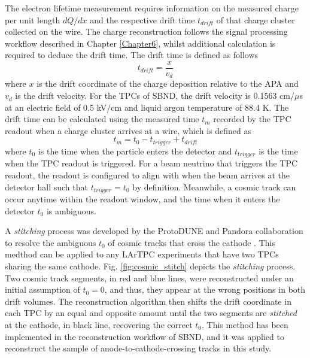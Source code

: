 The electron lifetime measurement requires information on the measured charge per unit length $dQ/dx$ and the respective drift time $t_{drift}$ of that charge cluster collected on the wire.
The charge reconstruction follows the signal processing workflow described in Chapter \ref{Chapter6}, whilst additional calculation is required to deduce the drift time.     
The drift time is defined as follows                                                                                          
\begin{equation}
        t_{drift} = \frac{x}{v_{d}}
\end{equation}
where $x$ is the drift coordinate of the charge deposition relative to the APA and $v_{d}$ is the drift velocity.
For the TPCs of SBND, the drift velocity is 0.1563 cm/$\mu$s at an electric field of 0.5 kV/cm and liquid argon temperature of 88.4 K.
The drift time can be calculated using the measured time $t_{m}$ recorded by the TPC readout when a charge cluster arrives at a wire, which is defined as \cite{pandora_protodune}
\begin{equation}
\label{eq:t0}
        t_{m} = t_{0} - t_{trigger} + t_{drift} 
\end{equation}
where $t_{0}$ is the time when the particle enters the detector and $t_{trigger}$ is the time when the TPC readout is triggered.
For a beam neutrino that triggers the TPC readout, the readout is configured to align with when the beam arrives at the detector hall such that $t_{trigger} = t_{0}$ by definition.
Meanwhile, a cosmic track can occur anytime within the readout window, and the time when it enters the detector $t_{0}$ is ambiguous.

A \textit{stitching} process was developed by the ProtoDUNE and Pandora collaboration to resolve the ambiguous $t_{0}$ of cosmic tracks that cross the cathode \cite{pandora_protodune}.
This medthod can be applied to any LArTPC experiments that have two TPCs sharing the same cathode.
Fig. \ref{fig:cosmic_stitch} depicts the \textit{stitching} process.
Two cosmic track segments, in red and blue lines, were reconstructed under an initial assumption of $t_{0} = 0$, and thus, they appear at the wrong positions in both drift volumes.
The reconstruction algorithm then shifts the drift coordinate in each TPC by an equal and opposite amount until the two segments are \textit{stitched} at the cathode, in black line, recovering 
the correct $t_{0}$.                                                                                                                                                                                   
This method has been implemented in the reconstruction workflow of SBND, and it was applied to reconstruct the sample of anode-to-cathode-crossing tracks in this study.

